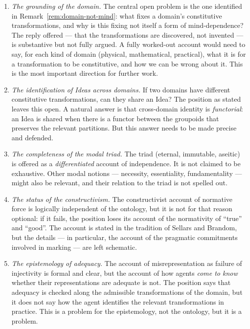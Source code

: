 \documentclass[11pt,a4paper]{article}
\theoremstyle{definition}
\theoremstyle{remark}
\begin{document}
\begin{enumerate}[label=(\arabic*),nosep]
  \item \emph{The grounding of the domain.} The central open problem
        is the one identified in Remark~\ref{rem:domain-not-mind}:
        what fixes a domain's constitutive transformations, and why
        is this fixing not itself a form of mind-dependence? The
        reply offered --- that the transformations are discovered,
        not invented --- is substantive but not fully argued. A
        fully worked-out account would need to say, for each kind of
        domain (physical, mathematical, practical), what it is for a
        transformation to be constitutive, and how we can be wrong
        about it. This is the most important direction for further
        work.
  \item \emph{The identification of Ideas across domains.} If two
        domains have different constitutive transformations, can they
        share an Idea? The position as stated leaves this open. A
        natural answer is that cross-domain identity is
        \emph{functorial}: an Idea is shared when there is a functor
        between the groupoids that preserves the relevant partitions.
        But this answer needs to be made precise and defended.
  \item \emph{The completeness of the modal triad.} The triad
        (eternal, immutable, aseitic) is offered as a
        \emph{differentiated} account of independence. It is not
        claimed to be exhaustive. Other modal notions --- necessity,
        essentiality, fundamentality --- might also be relevant, and
        their relation to the triad is not spelled out.
  \item \emph{The status of the constructivism.} The constructivist
        account of normative force is logically independent of the
        ontology, but it is not for that reason optional: if it
        fails, the position loses its account of the normativity of
        ``true'' and ``good''. The account is stated in the tradition
        of Sellars and Brandom, but the details --- in particular, the
        account of the pragmatic commitments involved in marking ---
        are left schematic.
  \item \emph{The epistemology of adequacy.} The account of
        misrepresentation as failure of injectivity is formal and
        clear, but the account of how agents \emph{come to know}
        whether their representations are adequate is not. The
        position says that adequacy is checked along the admissible
        transformations of the domain, but it does not say how the
        agent identifies the relevant transformations in practice.
        This is a problem for the epistemology, not the ontology, but
        it is a problem.
\end{enumerate}
\end{document}
